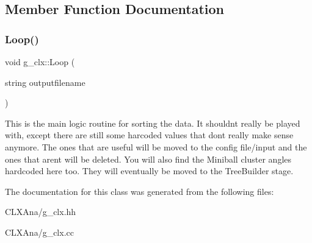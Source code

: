 \subsection{Member Function Documentation}
\mbox{\label{classg__clx_a9d5de859df4bfbb746726661ff1d24a9}} 
\subsubsection{\texorpdfstring{Loop()}{Loop()}}
{\footnotesize\ttfamily void g\+\_\+clx\+::\+Loop (\begin{DoxyParamCaption}\item[{string}]{outputfilename }\end{DoxyParamCaption})\hspace{0.3cm}{\ttfamily [virtual]}}

This is the main logic routine for sorting the data. It shouldn\textquotesingle{}t really be played with, except there are still some harcoded values that don\textquotesingle{}t really make sense anymore. The ones that are useful will be moved to the config file/input and the ones that aren\textquotesingle{}t will be deleted. You will also find the Miniball cluster angles hardcoded here too. They will eventually be moved to the Tree\+Builder stage. 

The documentation for this class was generated from the following files\+:\begin{DoxyCompactItemize}
\item 
C\+L\+X\+Ana/g\+\_\+clx.\+hh\item 
C\+L\+X\+Ana/g\+\_\+clx.\+cc\end{DoxyCompactItemize}
